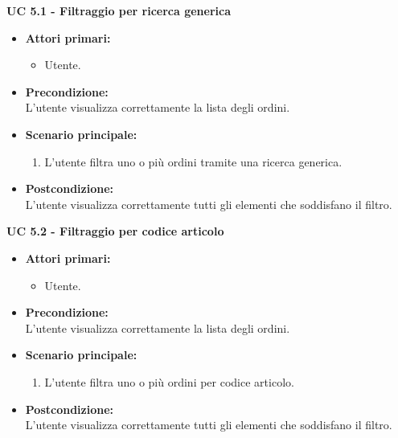 \vspace{0.4cm}

\noindent \textbf{\large UC 5.1 - Filtraggio per ricerca generica}
\label{uc:filtraggio-ricerca-generica}
\begin{itemize}

	\item \textbf{Attori primari: }
		\begin{itemize}
			\item Utente.
		\end{itemize}

	\item \textbf{Precondizione: }\\[0.3cm]
		L'utente visualizza correttamente la lista degli ordini.

	\item \textbf{Scenario principale: }
		\begin{enumerate}
			\item L'utente filtra uno o più ordini tramite una ricerca generica.
		\end{enumerate}
		

	\item \textbf{Postcondizione: }\\[0.3cm]
		L'utente visualizza correttamente tutti gli elementi che soddisfano il filtro.

\end{itemize}

\vspace{0.4cm}

\noindent \textbf{\large UC 5.2 - Filtraggio per codice articolo}
\label{uc:filtraggio-codice-articolo}
\begin{itemize}

	\item \textbf{Attori primari: }
		\begin{itemize}
			\item Utente.
		\end{itemize}

	\item \textbf{Precondizione: }\\[0.3cm]
		L'utente visualizza correttamente la lista degli ordini.

	\item \textbf{Scenario principale: }
		\begin{enumerate}
			\item L'utente filtra uno o più ordini per codice articolo.
		\end{enumerate}
		

	\item \textbf{Postcondizione: }\\[0.3cm]
		L'utente visualizza correttamente tutti gli elementi che soddisfano il filtro.

\end{itemize}

